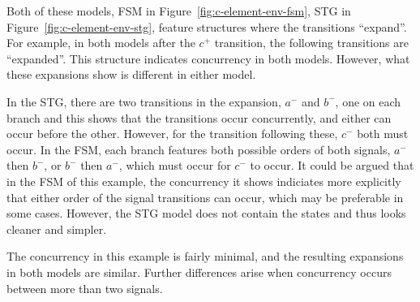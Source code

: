 Both of these models, FSM in Figure~\ref{fig:c-element-env-fsm}, STG in Figure~\ref{fig:c-element-env-stg}, feature structures 
where the transitions ``expand''. For example, in both models after the $c^{+}$ transition, the following transitions are ``expanded''. 
This structure indicates concurrency in both models. However, what these expansions show is different in either model. 

In the STG, there are two transitions in the expansion, $a^{-}$ and $b^{-}$, one on each branch and this shows that the transitions
 occur concurrently, and either can occur before the other. However, for the transition following these, $c^{-}$ both must occur.
In the FSM, each branch features both possible orders of both signals, $a^{-}$ then $b^{-}$, or $b^{-}$ then $a^{-}$, which must occur
for $c^{-}$ to occur. It could be argued that in the FSM of this example, the concurrency it shows indiciates more explicitly that either order of the
signal transitions can occur, which may be preferable in some cases. However, the STG model does not contain the states and thus looks
cleaner and simpler.

The concurrency in this example is fairly minimal, and the resulting expansions in both models are similar. Further differences arise when 
concurrency occurs between more than two signals.